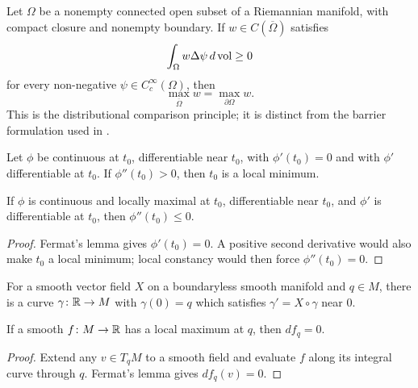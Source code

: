 \begin{claim}
\label{claim:weak-subsolution-comparison}

Let $\Omega$ be a nonempty connected open subset of a Riemannian
manifold, with compact closure and nonempty boundary. If
$w\in C(\overline\Omega)$ satisfies
$$\int_\Omega w\Delta\psi\,d\operatorname{vol}\ge0$$
for every non-negative $\psi\in C_c^\infty(\Omega)$, then
$$\max_{\overline\Omega}w=\max_{\partial\Omega}w.$$
This is the distributional comparison principle; it is distinct from
the barrier formulation used in \cite{Petersen}.
\end{claim}

\begin{lemma}
\label{lem:second-derivative-test-min}

Let $\phi$ be continuous at $t_0$, differentiable near $t_0$, with
$\phi'(t_0)=0$ and with $\phi'$ differentiable at $t_0$. If
$\phi''(t_0)>0$, then $t_0$ is a local minimum.
\end{lemma}

\begin{lemma}
\label{lem:second-derivative-test-max}




If $\phi$ is continuous and locally maximal at $t_0$, differentiable
near $t_0$, and $\phi'$ is differentiable at $t_0$, then
$\phi''(t_0)\le0$.
\end{lemma}
\begin{proof}
\sketch

Fermat's lemma gives $\phi'(t_0)=0$. A positive second derivative would
also make $t_0$ a local minimum; local constancy would then force
$\phi''(t_0)=0$.
\end{proof}

\begin{lemma}
\label{lem:integral-curve-exists}

For a smooth vector field $X$ on a boundaryless smooth manifold and
$q\in M$, there is a curve $\gamma\colon\mathbb{R}\to M$ with $\gamma(0)=q$
which satisfies $\gamma'=X\circ\gamma$ near $0$.
\end{lemma}

\begin{lemma}
\label{lem:differential-vanishes-at-max}



If a smooth $f\colon M\to\mathbb{R}$ has a local maximum at $q$, then
$df_q=0$.
\end{lemma}
\begin{proof}
\sketch

Extend any $v\in T_qM$ to a smooth field and evaluate $f$ along its
integral curve through $q$. Fermat's lemma gives $df_q(v)=0$.
\end{proof}

